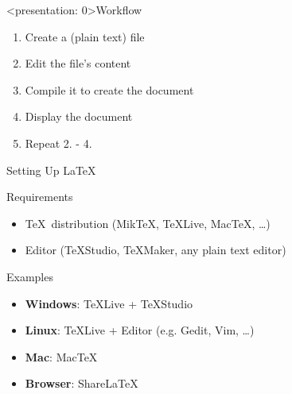 \documentclass[table]{beamer}
\newcommand{\latex}{\LaTeX\ }
\begin{document}
\begin{frame}<presentation: 0>{Workflow}

    \begin{enumerate}
        \item Create a (plain text) file
        \item Edit the file's content %
        \item Compile it to create the document %
        \item Display the document %
        \item Repeat 2. - 4.
    \end{enumerate}
\end{frame}


\begin{frame}{Setting Up \latex}
    \begin{block}{Requirements}
    \begin{itemize}
        \item \TeX\ distribution (MikTeX, TeXLive, MacTeX, \dots)
        \item Editor (TeXStudio, TeXMaker, any plain text editor)
    \end{itemize}
    \end{block}

    \begin{block}{Examples}
    \begin{itemize}
    \item \textbf{Windows}: TeXLive + TeXStudio
    \item \textbf{Linux}: TeXLive + Editor (e.g. Gedit, Vim, \dots)
    \item \textbf{Mac}: MacTeX
    \item \textbf{Browser}: ShareLaTeX
    \end{itemize}
    \end{block}
\end{frame}
\end{document}
